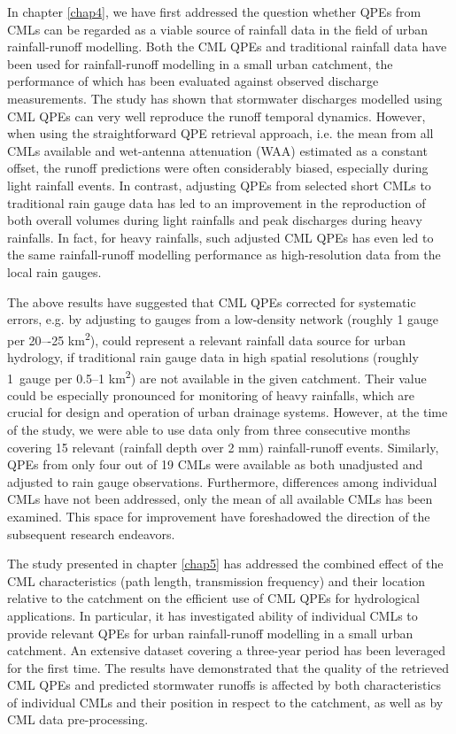\documentclass{ctuthesis}\usepackage[]{graphicx}\usepackage[]{color}
\begin{document}
In chapter \ref{chap4}, we have first addressed the question whether QPEs from CMLs can be regarded as a viable source of rainfall data in the field of urban rainfall-runoff modelling. Both the CML QPEs and traditional rainfall data have been used for rainfall-runoff modelling in a small urban catchment, the performance of which has been evaluated against observed discharge measurements. The study has shown that stormwater discharges modelled using CML QPEs can very well reproduce the runoff temporal dynamics. However, when using the straightforward QPE retrieval approach, i.e. the mean from all CMLs available and wet-antenna attenuation (WAA) estimated as a constant offset, the runoff predictions were often considerably biased, especially during light rainfall events. In contrast, adjusting QPEs from selected short CMLs to traditional rain gauge data has led to an improvement in the reproduction of both overall volumes during light rainfalls and peak discharges during heavy rainfalls. In fact, for heavy rainfalls, such adjusted CML QPEs has even led to the same rainfall-runoff modelling performance as high-resolution data from the local rain gauges. 

The above results have suggested that CML QPEs corrected for systematic errors, e.g. by adjusting to gauges from a low-density network (roughly 1 gauge per 20–-25 km\textsuperscript{2}), could represent a relevant rainfall data source for urban hydrology, if traditional rain gauge data in high spatial resolutions (roughly  1~gauge per 0.5--1 km\textsuperscript{2}) are not available in the given catchment. Their value could be especially pronounced for monitoring of heavy rainfalls, which are crucial for design and operation of urban drainage systems. However, at the time of the study, we were able to use data only from three consecutive months covering 15 relevant (rainfall depth over 2 mm) rainfall-runoff events. Similarly, QPEs from only four out of 19 CMLs were available as both unadjusted and adjusted to rain gauge observations. Furthermore, differences among individual CMLs have not been addressed, only the mean of all available CMLs has been examined. This space for improvement have foreshadowed the direction of the subsequent research endeavors.

 

The study presented in chapter \ref{chap5} has addressed the combined effect of the CML characteristics (path length, transmission frequency) and their location relative to the catchment on the efficient use of CML QPEs for hydrological applications. In particular, it has investigated ability of individual CMLs to provide relevant QPEs for urban rainfall-runoff modelling in a small urban catchment. An extensive dataset covering a three-year period has been leveraged for the first time. The results have demonstrated that the quality of the retrieved CML QPEs and predicted stormwater runoffs is affected by both characteristics of individual CMLs and their position in respect to the catchment, as well as by  CML data pre-processing.
\end{document}
